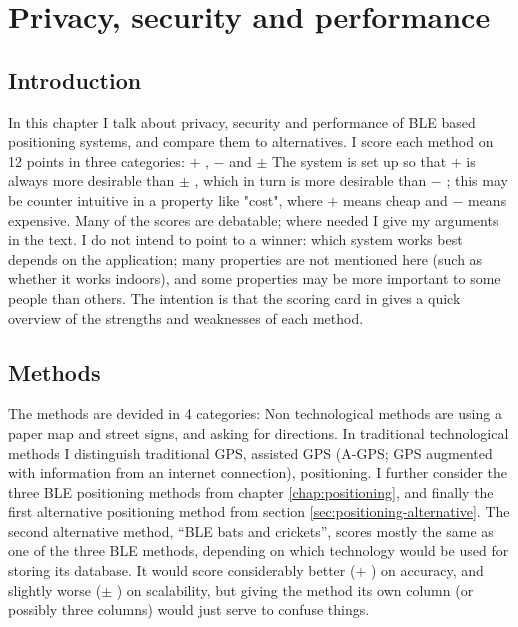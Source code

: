 \chapter{Privacy, security and performance}
\label{chap:security}


\newcommand{\yes}{\(+\) }
\newcommand{\no}{\(-\) }
\newcommand{\maybe}{\(\pm\) }
\newcommand{\cat}[1]{\begin{em}#1\end{em}}

\section{Introduction}
In this chapter I talk about privacy, security and performance of BLE based positioning systems, and compare them to alternatives.
I score each method on 12 points in three categories: \yes, \no and \maybe
The system is set up so that \yes is always more desirable than \maybe, which in turn is more desirable than \no; this may be counter intuitive in a property like "cost", where \yes means cheap and \no means expensive.
Many of the scores are debatable; where needed I give my arguments in the text.
I do not intend to point to a winner: which system works best depends on the application; many properties are not mentioned here (such as whether it works indoors), and some properties may be more important to some people than others.
The intention is that the scoring card in  gives a quick overview of the strengths and weaknesses of each method.

\section{Methods}
The methods are devided in 4 categories: Non technological methods are using a paper map and street signs, and asking for directions.
In traditional technological methods I distinguish traditional GPS, assisted GPS (A-GPS; GPS augmented with information from an internet connection), \wifi positioning.
I further consider the three BLE positioning methods from chapter \ref{chap:positioning}, and finally the first alternative positioning method from section \ref{sec:positioning-alternative}.
The second alternative method, ``BLE bats and crickets'', scores mostly the same as one of the three BLE methods, depending on which technology would be used for storing its database.
It would score considerably better (\yes) on accuracy, and slightly worse (\maybe) on scalability, but giving the method its own column (or possibly three columns) would just serve to confuse things.

